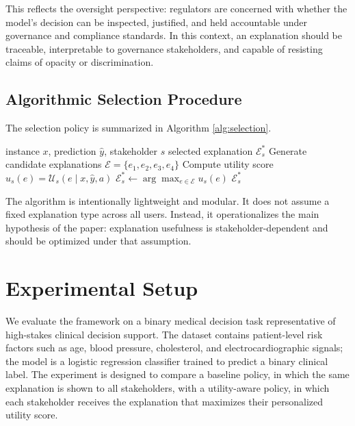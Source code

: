 \documentclass{article}
\begin{document}
This reflects the oversight perspective: regulators are concerned with whether the model's decision can be inspected, justified, and held accountable under governance and compliance standards. In this context, an explanation should be traceable, interpretable to governance stakeholders, and capable of resisting claims of opacity or discrimination.

\subsection{Algorithmic Selection Procedure}

The selection policy is summarized in Algorithm \ref{alg:selection}.

\begin{algorithm}[H]
\caption{Stakeholder-aware explanation selection}
\label{alg:selection}
\begin{algorithmic}[1]
\Require instance $x$, prediction $\hat{y}$, stakeholder $s$
\Ensure selected explanation $\mathcal{E}^*_s$
\State Generate candidate explanations $\mathcal{E} = \{e_1, e_2, e_3, e_4\}$
    \State Compute utility score $u_s(e) = \mathcal{U}_s(e \mid x, \hat{y}, a)$
\EndFor
\State $\mathcal{E}^*_s \gets \arg\max_{e \in \mathcal{E}} u_s(e)$
\State \Return $\mathcal{E}^*_s$
\end{algorithmic}
\end{algorithm}

The algorithm is intentionally lightweight and modular. It does not assume a fixed explanation type across all users. Instead, it operationalizes the main hypothesis of the paper: explanation usefulness is stakeholder-dependent and should be optimized under that assumption.

\section{Experimental Setup}

We evaluate the framework on a binary medical decision task representative of high-stakes clinical decision support. The dataset contains patient-level risk factors such as age, blood pressure, cholesterol, and electrocardiographic signals; the model is a logistic regression classifier trained to predict a binary clinical label. The experiment is designed to compare a baseline policy, in which the same explanation is shown to all stakeholders, with a utility-aware policy, in which each stakeholder receives the explanation that maximizes their personalized utility score.
\end{document}

